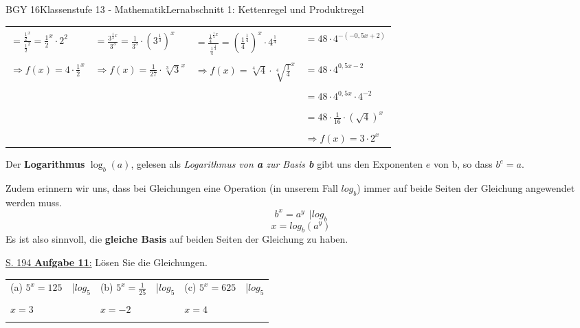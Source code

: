\documentclass[oneside,openany,headings=optiontotoc,11pt,numbers=noenddot]{scrreprt}
\begin{document}
\begin{worksheet}{BGY 16}{Klassenstufe 13 - Mathematik}{Lernabschnitt 1: Kettenregel und Produktregel}
\begin{framed}
\begin{tabularx}{\textwidth}{l|l|l|l}
				& & & \\
				\(= \frac{\frac{1}{2}^x}{\frac{1}{2}^2} = \frac{1}{2}^x\cdot{}2^2\) & \(= \frac{3^{\frac{1}{3}x}}{3^3}= \frac{1}{3^3}\cdot{}\left(3^\frac{1}{3}\right)^x\) & \(= \frac{\frac{1}{4}^{\frac{1}{4}x}}{\frac{1}{4}^{\frac{1}{4}}} = \left(\frac{1}{4}^{\frac{1}{4}}\right)^x\cdot{}4^{\frac{1}{4}}\) & \(= 48\cdot4^{-(-0,5x+2)}\)\\
				& & & \\
				\(\Rightarrow f(x) = 4\cdot{}\frac{1}{2}^x\) & \(\Rightarrow f(x)= \frac{1}{27}\cdot{}\sqrt[3]{3}^x\) & \(\Rightarrow f(x)= \sqrt[4]{4}\cdot{}\sqrt[4]{\frac{1}{4}}^x\) & \(= 48\cdot{}4^{0,5x-2}\)\\
				& & & \\
				& & & \(= 48\cdot{}4^{0,5x}\cdot4^{-2}\)\\
				& & & \\
				& & & \(= 48\cdot{}\frac{1}{16}\cdot{}(\sqrt{4})^x\)\\
				& & & \\
				& & & \(\Rightarrow f(x) = 3\cdot{}2^x\)
			\end{tabularx}
		\end{framed}
		\newpage
		\begin{framed}
			\noindent
			Der \textbf{Logarithmus} \(\log_b(a)\), gelesen als \textit{Logarithmus von \textbf{a} zur Basis \textbf{b}} gibt uns den Exponenten \(e\) von b, so dass \( b^e = a\).\\
			\par\bigskip\noindent
			Zudem erinnern wir uns, dass bei Gleichungen eine Operation (in unserem Fall \(log_b\)) immer auf beide Seiten der Gleichung angewendet werden muss.\\
			\[b^x = a^y\ \ |log_b\]
			\[x = log_b(a^y)\]
			Es ist also sinnvoll, die \textbf{gleiche Basis} auf beiden Seiten der Gleichung zu haben.
		\end{framed}
		\begin{framed}
			\noindent
			\small{\color{codegray}\underline{S. 194 \textbf{Aufgabe 11}:} Lösen Sie die Gleichungen.}\\
			\par
			\begin{tabularx}{\textwidth}{Xl|Xl|Xl}
				(a) \(5^x = 125\) & |\(log_5\) & (b) \(5^x = \frac{1}{25}\) & |\(log_5\) & (c) \(5^x = 625\) & |\(log_5\)\\
				& & & & & \\
				\(x = 3\) & & \(x = -2\) & & \(x = 4\)\\
				& & & & & \\

\end{tabularx}
\end{framed}
\end{worksheet}
\end{document}
